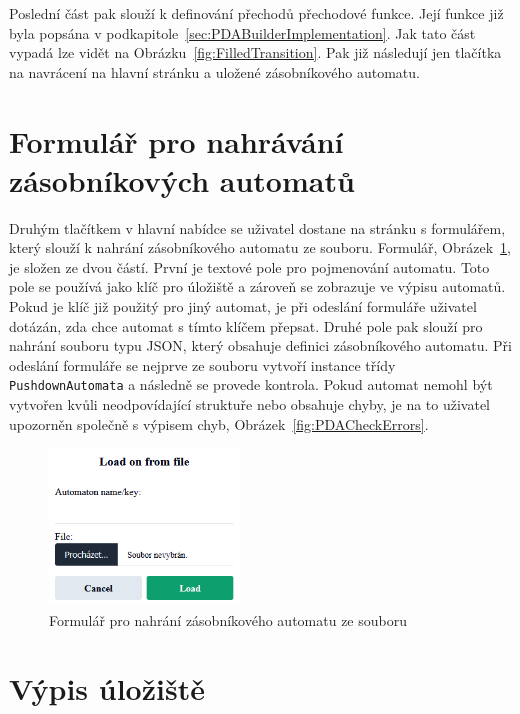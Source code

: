 Poslední část pak slouží k definování přechodů přechodové funkce. Její funkce již byla popsána v podkapitole~\ref{sec:PDABuilderImplementation}. Jak tato část vypadá lze vidět na Obrázku~\ref{fig:FilledTransition}. Pak již následují jen tlačítka na navrácení na hlavní stránku a uložené zásobníkového automatu.

\section{Formulář pro nahrávání zásobníkových automatů}\label{sec:UploadForm}

Druhým tlačítkem v hlavní nabídce se uživatel dostane na stránku s formulářem, který slouží k nahrání zásobníkového automatu ze souboru. Formulář, Obrázek~\ref{fig:UploadForm}, je složen ze dvou částí. První je textové pole pro pojmenování automatu. Toto pole se používá jako klíč pro úložiště a zároveň se zobrazuje ve výpisu automatů. Pokud je klíč již použitý pro jiný automat, je při odeslání formuláře uživatel dotázán, zda chce automat s tímto klíčem přepsat. Druhé pole pak slouží pro nahrání souboru typu JSON, který obsahuje definici zásobníkového automatu. Při odeslání formuláře se nejprve ze souboru vytvoří instance třídy \texttt{PushdownAutomata} a následně se provede kontrola. Pokud automat nemohl být vytvořen kvůli neodpovídající struktuře nebo obsahuje chyby, je na to uživatel upozorněn společně s výpisem chyb, Obrázek~\ref{fig:PDACheckErrors}.

\begin{figure}[h]
    \centering
    \includegraphics[width=0.45\textwidth]{Figures/PrntScrn_UI_Upload.png}
    \caption{Formulář pro nahrání zásobníkového automatu ze souboru}\label{fig:UploadForm}
\end{figure}

\section{Výpis úložiště}\label{sec:StoragePage}

